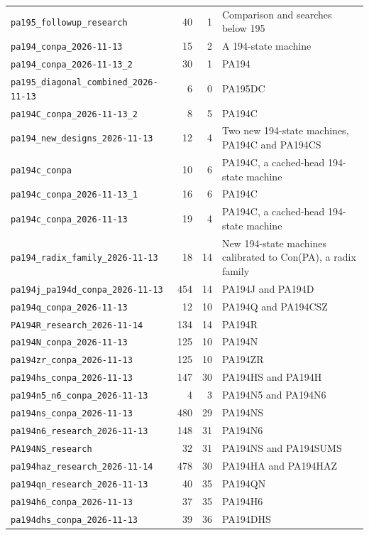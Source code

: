 \begin{longtable}{@{}p{.39\linewidth}rrp{.43\linewidth}@{}}
\nolinkurl{pa195_followup_research} & 40 & 1 & Comparison and searches below 195 \\
\nolinkurl{pa194_conpa_2026-11-13} & 15 & 2 & A 194-state machine \\
\nolinkurl{pa194_conpa_2026-11-13_2} & 30 & 1 & PA194 \\
\nolinkurl{pa195_diagonal_combined_2026-11-13} & 6 & 0 & PA195DC \\
\nolinkurl{pa194C_conpa_2026-11-13_2} & 8 & 5 & PA194C \\
\nolinkurl{pa194_new_designs_2026-11-13} & 12 & 4 & Two new 194-state machines, PA194C and PA194CS \\
\nolinkurl{pa194c_conpa} & 10 & 6 & PA194C, a cached-head 194-state machine \\
\nolinkurl{pa194c_conpa_2026-11-13_1} & 16 & 6 & PA194C \\
\nolinkurl{pa194c_conpa_2026-11-13} & 19 & 4 & PA194C, a cached-head 194-state machine \\
\nolinkurl{pa194_radix_family_2026-11-13} & 18 & 14 & New 194-state machines calibrated to Con(PA), a radix family \\
\nolinkurl{pa194j_pa194d_conpa_2026-11-13} & 454 & 14 & PA194J and PA194D \\
\nolinkurl{pa194q_conpa_2026-11-13} & 12 & 10 & PA194Q and PA194CSZ \\
\nolinkurl{PA194R_research_2026-11-14} & 134 & 14 & PA194R \\
\nolinkurl{pa194N_conpa_2026-11-13} & 125 & 10 & PA194N \\
\nolinkurl{pa194zr_conpa_2026-11-13} & 125 & 10 & PA194ZR \\
\nolinkurl{pa194hs_conpa_2026-11-13} & 147 & 30 & PA194HS and PA194H \\
\nolinkurl{pa194n5_n6_conpa_2026-11-13} & 4 & 3 & PA194N5 and PA194N6 \\
\nolinkurl{pa194ns_conpa_2026-11-13} & 480 & 29 & PA194NS \\
\nolinkurl{pa194n6_research_2026-11-13} & 148 & 31 & PA194N6 \\
\nolinkurl{PA194NS_research} & 32 & 31 & PA194NS and PA194SUMS \\
\nolinkurl{pa194haz_research_2026-11-14} & 478 & 30 & PA194HA and PA194HAZ \\
\nolinkurl{pa194qn_research_2026-11-13} & 40 & 35 & PA194QN \\
\nolinkurl{pa194h6_conpa_2026-11-13} & 37 & 35 & PA194H6 \\
\nolinkurl{pa194dhs_conpa_2026-11-13} & 39 & 36 & PA194DHS \\

\end{longtable}
